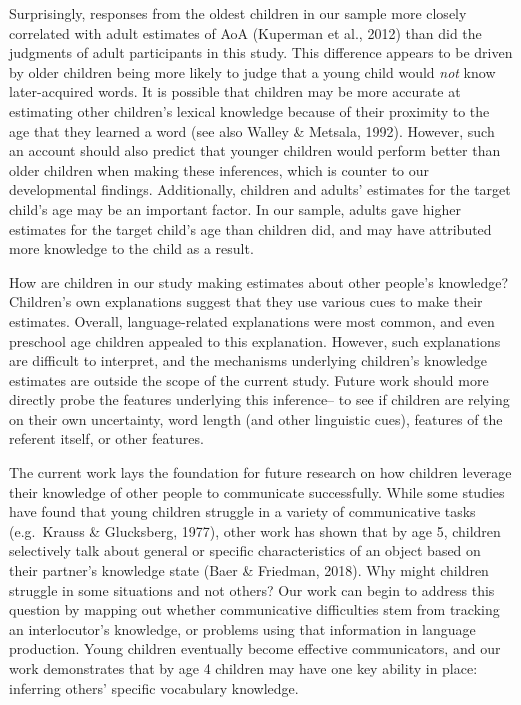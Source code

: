 \documentclass[10pt, letterpaper]{article}
\begin{document}
Surprisingly, responses from the oldest children in our sample more
closely correlated with adult estimates of AoA (Kuperman et al., 2012)
than did the judgments of adult participants in this study. This
difference appears to be driven by older children being more likely to
judge that a young child would \emph{not} know later-acquired words. It
is possible that children may be more accurate at estimating other
children's lexical knowledge because of their proximity to the age that
they learned a word (see also Walley \& Metsala, 1992). However, such an
account should also predict that younger children would perform better
than older children when making these inferences, which is counter to
our developmental findings. Additionally, children and adults' estimates
for the target child's age may be an important factor. In our sample,
adults gave higher estimates for the target child's age than children
did, and may have attributed more knowledge to the child as a result.

How are children in our study making estimates about other people's
knowledge? Children's own explanations suggest that they use various
cues to make their estimates. Overall, language-related explanations
were most common, and even preschool age children appealed to this
explanation. However, such explanations are difficult to interpret, and
the mechanisms underlying children's knowledge estimates are outside the
scope of the current study. Future work should more directly probe the
features underlying this inference-- to see if children are relying on
their own uncertainty, word length (and other linguistic cues), features
of the referent itself, or other features.

The current work lays the foundation for future research on how children
leverage their knowledge of other people to communicate successfully.
While some studies have found that young children struggle in a variety
of communicative tasks (e.g.~Krauss \& Glucksberg, 1977), other work has
shown that by age 5, children selectively talk about general or specific
characteristics of an object based on their partner's knowledge state
(Baer \& Friedman, 2018). Why might children struggle in some situations
and not others? Our work can begin to address this question by mapping
out whether communicative difficulties stem from tracking an
interlocutor's knowledge, or problems using that information in language
production. Young children eventually become effective communicators,
and our work demonstrates that by age 4 children may have one key
ability in place: inferring others' specific vocabulary knowledge.
\end{document}
